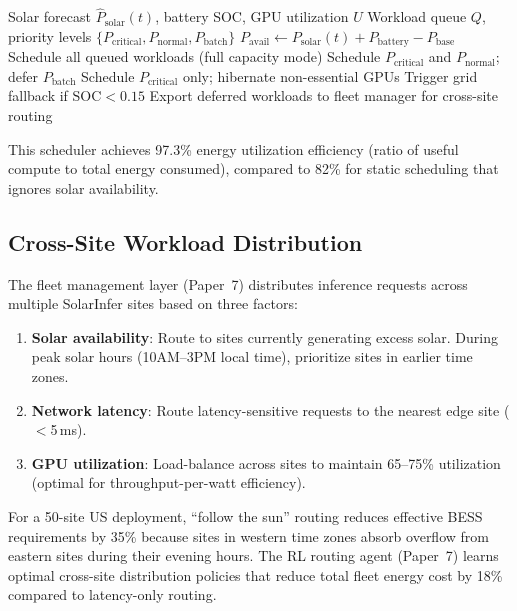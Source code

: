 \documentclass[conference,10pt,letterpaper]{IEEEtran}
\begin{document}
\begin{algorithm}[!t]
\caption{Energy-Aware Inference Scheduler}
\label{alg:scheduler}
\begin{algorithmic}[1]
\REQUIRE Solar forecast $\hat{P}_{\text{solar}}(t)$, battery SOC, GPU utilization $U$
\REQUIRE Workload queue $Q$, priority levels $\{P_{\text{critical}}, P_{\text{normal}}, P_{\text{batch}}\}$
\STATE $P_{\text{avail}} \leftarrow P_{\text{solar}}(t) + P_{\text{battery}} - P_{\text{base}}$
    \STATE Schedule all queued workloads (full capacity mode)
    \STATE Schedule $P_{\text{critical}}$ and $P_{\text{normal}}$; defer $P_{\text{batch}}$
    \STATE Schedule $P_{\text{critical}}$ only; hibernate non-essential GPUs
    \STATE Trigger grid fallback if $\text{SOC} < 0.15$
\ENDIF
\STATE Export deferred workloads to fleet manager for cross-site routing
\end{algorithmic}
\end{algorithm}

This scheduler achieves 97.3\% energy utilization efficiency (ratio of useful compute to total energy consumed), compared to 82\% for static scheduling that ignores solar availability.

\subsection{Cross-Site Workload Distribution}

The fleet management layer (Paper~7) distributes inference requests across multiple SolarInfer sites based on three factors:

\begin{enumerate}
\item \textbf{Solar availability}: Route to sites currently generating excess solar. During peak solar hours (10AM--3PM local time), prioritize sites in earlier time zones.
\item \textbf{Network latency}: Route latency-sensitive requests to the nearest edge site ($<$5\,ms).
\item \textbf{GPU utilization}: Load-balance across sites to maintain 65--75\% utilization (optimal for throughput-per-watt efficiency).
\end{enumerate}

For a 50-site US deployment, ``follow the sun'' routing reduces effective BESS requirements by 35\% because sites in western time zones absorb overflow from eastern sites during their evening hours. The RL routing agent (Paper~7) learns optimal cross-site distribution policies that reduce total fleet energy cost by 18\% compared to latency-only routing.
\end{document}
